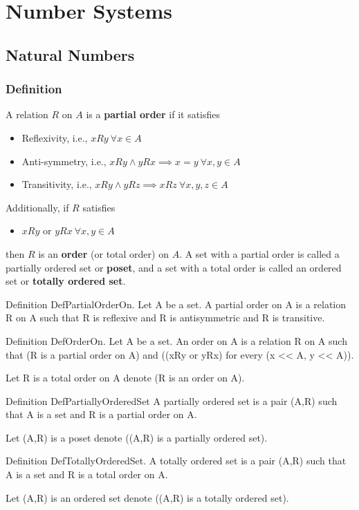 \section{Number Systems}

\subsection{Natural Numbers}

\subsubsection{Definition}
\begin{true}
A relation $R$ on $A$ is a \textbf{partial order} if it satisfies
\begin{itemize}
    \item Reflexivity, i.e., $xRy \ \forall x \in A$
    \item Anti-symmetry, i.e., $xRy \land yRx \implies x = y \ \forall x,y \in A$
    \item Transitivity, i.e., $xRy \land yRz \implies xRz \ \forall x,y,z \in A$
\end{itemize}
Additionally, if $R$ satisfies
\begin{itemize}
    \item $xRy$ or $yRx \ \forall x,y \in A$
\end{itemize}
then $R$ is an \textbf{order} (or total order) on $A$. A set with a partial order is called a partially ordered set or \textbf{poset}, and a set with a total order is called an ordered set or \textbf{totally ordered set}.
\end{true}
\begin{forthel}
Definition DefPartialOrderOn.
    Let A be a set.
    A partial order on A is a relation R on A such that
    R is reflexive and R is antisymmetric and R is transitive.

Definition DefOrderOn.
    Let A be a set.
    An order on A is a relation R on A such that
    (R is a partial order on A) and ((xRy or yRx) for every (x << A, y << A)).

Let R is a total order on A denote (R is an order on A).

Definition DefPartiallyOrderedSet
    A partially ordered set is a pair (A,R) such that A is a set and R is a partial order on A.

Let (A,R) is a poset denote ((A,R) is a partially ordered set).

Definition DefTotallyOrderedSet.
    A totally ordered set is a pair (A,R) such that A is a set and R is a total order on A.

Let (A,R) is an ordered set denote ((A,R) is a totally ordered set).
\end{forthel}
